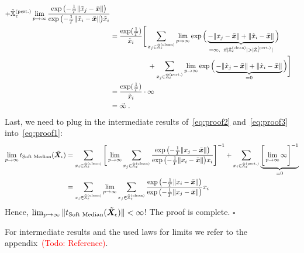 \documentclass{article} %
\newcommand{\pertm}{\tilde{\mX}_\epsilon}
\newcommand{\pertmset}{\tilde{\sX}_\epsilon}
\newenvironment{proof}{}{$\square$}
\newcommand{\todo}[1]{\textcolor{red}{(Todo: #1)}}
\begin{document}
\begin{proof}
\begin{equation}
\begin{aligned}
{         + \pertmset^{(\text{pert.})}} \lim_{p \to \infty} \frac{ \exp{\left (-\frac{1}{T} \|\tilde{\evx}_j - \bar{\vx}\| \right )}}{\exp{\left(-\frac{1}{T} \|\tilde{\evx}_i - \bar{\vx}\| \right )} \tilde{\evx}_i } \\
         &=  \frac{ \exp(\frac{1}{T})}{\tilde{\evx}_i } \Bigg[ \sum_{\evx_j \in \pertmset^{(\text{clean})}} \lim_{p \to \infty} \exp{\Big( \underbrace{-\|\evx_j - \bar{\vx}\| + \|\tilde{\evx}_i - \bar{\vx}\|}_{=\infty,\;\;\text{if} |\pertmset^{(\text{clean})}| > |\pertmset^{(\text{pert.})}|} \Big)  } \\
         & \hspace{55pt} + \sum_{\evx_j \in \pertmset^{(\text{pert.})}}  \lim_{p \to \infty} \exp{\Big( \underbrace{-\|\tilde{\evx}_j - \bar{\vx}\| + \|\tilde{\evx}_i - \bar{\vx}\|}_{=0} \Big)  } \Bigg]\\
         &= \frac{ \exp(\frac{1}{T})}{\tilde{\evx}_i } \cdot \infty \\
         &= \vec{\infty}\;. \\
        \end{aligned} 
    \end{equation}
    Last, we need to plug in the intermediate results of~\autoref{eq:proof2} and~\autoref{eq:proof3} into~\autoref{eq:proof1}:
    \begin{equation}\label{eq:proof1}
        \begin{aligned}
        \lim_{p \to \infty} t_{\text{Soft Median}}(\pertm) 
        &= \sum_{\evx_i \in \pertmset^{(\text{clean})}} \Bigg[ \lim_{p \to \infty} \sum_{\evx_j \in \pertmset^{(\text{clean})}} \frac{ \exp{\left (-\frac{1}{T} \|\evx_j - \bar{\vx}\| \right )}}{\exp{\left(-\frac{1}{T} \|\evx_i - \bar{\vx}\| \right )} \evx_i } \Bigg]^{-1} + \sum_{\evx_i \in \pertmset^{(\text{pert.})}} \underbrace{\Bigg[ \lim_{p \to \infty} \infty \Bigg]^{-1}}_{=0} \\
        &= \sum_{\evx_i \in \pertmset^{(\text{clean})}} \lim_{p \to \infty} \sum_{\evx_j \in \pertmset^{(\text{clean})}} \frac{\exp{\left(-\frac{1}{T} \|\evx_i - \bar{\vx}\| \right )} }{ \exp{\left (-\frac{1}{T} \|\evx_j - \bar{\vx}\| \right )}} \evx_i \\
        \end{aligned}
    \end{equation}
    Hence, \(\lim_{p \to \infty} \|t_{\text{Soft Median}}(\pertm)\| < \infty\)! The proof is complete.
\end{proof}

For intermediate results and the used laws for limits we refer to the appendix~\todo{Reference}.
\end{document}

